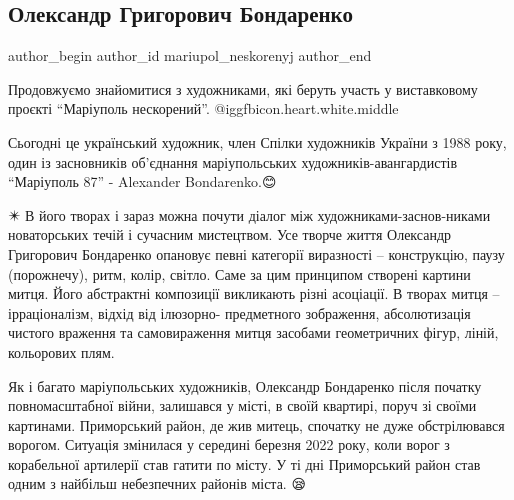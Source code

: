  
 
 
 
 

\subsection{Олександр Григорович Бондаренко}
\label{sec:19_08_2023.fb.mariupol_neskorenyj.1.oleksandr_grygorovych_bondarenko}

\ifcmt
 author_begin
   author_id mariupol_neskorenyj
 author_end
\fi

Продовжуємо знайомитися з художниками, які беруть участь у виставковому проєкті
\enquote{Маріуполь нескорений}. @igg{fbicon.heart.white.middle}

Сьогодні це український художник, член Спілки художників України з 1988 року,
один із засновників об'єднання маріупольських художників-авангардистів
\enquote{Маріуполь 87} - Alexander Bondarenko.️😊

✴️ В його творах і зараз можна почути діалог між художниками-заснов\hyp{}никами
новаторських течій і сучасним мистецтвом. Усе творче життя Олександр Григорович
Бондаренко опановує певні категорії виразності – конструкцію, паузу
(порожнечу), ритм, колір, світло. Саме за цим принципом створені картини митця.
Його абстрактні композиції викликають різні асоціації. В творах митця –
ірраціоналізм, відхід від ілюзорно- предметного зображення, абсолютизація
чистого враження та самовираження митця засобами геометричних фігур, ліній,
кольорових плям. 

Як і багато маріупольських художників, Олександр Бондаренко після початку
повномасштабної війни, залишався у місті, в своїй квартирі, поруч зі своїми
картинами. Приморський район, де жив митець, спочатку не дуже обстрілювався
ворогом. Ситуація змінилася у середині березня 2022 року, коли ворог з
корабельної артилерії став гатити по місту.  У ті дні  Приморський район став
одним з найбільш небезпечних районів міста. 😪

